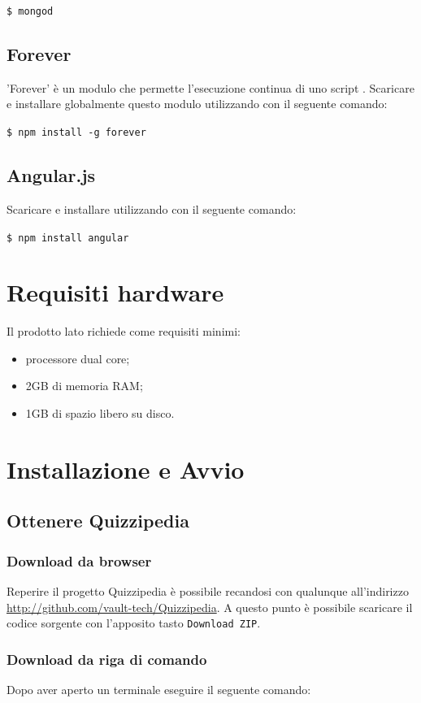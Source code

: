 \documentclass[a4paper, titlepage]{article}
\begin{document}
	\texttt{\$ mongod}

	\subsection{Forever}
	'Forever' è un modulo  che permette l'esecuzione continua di uno script .
	Scaricare e installare globalmente questo modulo utilizzando  con il seguente comando:

	\texttt{\$ npm install -g forever}
	
	\subsection{Angular.js}
	Scaricare e installare  utilizzando  con il seguente comando:

	\texttt{\$ npm install angular}
	
	\section{Requisiti hardware}
	Il prodotto lato  richiede come requisiti minimi:
	\begin{itemize}
		\item processore dual core;
		\item 2GB di memoria RAM;
		\item 1GB di spazio libero su disco.
	\end{itemize}
	
	\section{Installazione e Avvio}
	
	\subsection{Ottenere Quizzipedia}
	\subsubsection{Download da browser}
	Reperire il progetto Quizzipedia è possibile recandosi con qualunque  all'indirizzo \url{http://github.com/vault-tech/Quizzipedia}.
	A questo punto è possibile scaricare il codice sorgente con l'apposito tasto \texttt{Download ZIP}.

	\subsubsection{Download da riga di comando}
	Dopo aver aperto un terminale eseguire il seguente comando:
\end{document}
